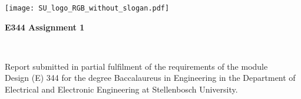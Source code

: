 \graphicspath{{frontmatter/figures/}}

\begin{titlepage}
\begin{center}

\texttt{[image: SU\_logo\_RGB\_without\_slogan.pdf]}

\vfill

{\sffamily \bfseries \huge E344 Assignment 1 \par}

\vfill

{\large {\Large \nameFull} \\ \stNumber \par}

\vfill

\vfill

{Report submitted in partial fulfilment of the requirements of the module \\
Design (E) 344 for the degree Baccalaureus in Engineering in the Department of
Electrical and Electronic Engineering at Stellenbosch University. \par}

\vfill


\vfill

{\Large \myDate}
\end{center}
\end{titlepage}
